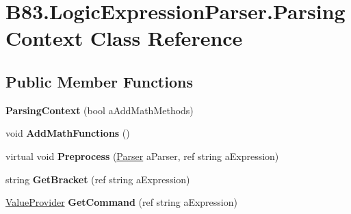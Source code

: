 \hypertarget{class_b83_1_1_logic_expression_parser_1_1_parsing_context}{}\section{B83.\+Logic\+Expression\+Parser.\+Parsing\+Context Class Reference}
\label{class_b83_1_1_logic_expression_parser_1_1_parsing_context}
\subsection*{Public Member Functions}
\begin{DoxyCompactItemize}
\item 
{\bfseries Parsing\+Context} (bool a\+Add\+Math\+Methods)\hypertarget{class_b83_1_1_logic_expression_parser_1_1_parsing_context_a8fd3f96aa1ed41e9201cdacb86ffe727}{}\label{class_b83_1_1_logic_expression_parser_1_1_parsing_context_a8fd3f96aa1ed41e9201cdacb86ffe727}

\item 
void {\bfseries Add\+Math\+Functions} ()\hypertarget{class_b83_1_1_logic_expression_parser_1_1_parsing_context_adf13fec27f2b382ca752e5fd30584e09}{}\label{class_b83_1_1_logic_expression_parser_1_1_parsing_context_adf13fec27f2b382ca752e5fd30584e09}

\item 
virtual void {\bfseries Preprocess} (\hyperlink{class_b83_1_1_logic_expression_parser_1_1_parser}{Parser} a\+Parser, ref string a\+Expression)\hypertarget{class_b83_1_1_logic_expression_parser_1_1_parsing_context_a95d2e21709c1e9783c31177c64445f8d}{}\label{class_b83_1_1_logic_expression_parser_1_1_parsing_context_a95d2e21709c1e9783c31177c64445f8d}

\item 
string {\bfseries Get\+Bracket} (ref string a\+Expression)\hypertarget{class_b83_1_1_logic_expression_parser_1_1_parsing_context_a828bf690ce404dcfd6dcb3966b43efd4}{}\label{class_b83_1_1_logic_expression_parser_1_1_parsing_context_a828bf690ce404dcfd6dcb3966b43efd4}

\item 
\hyperlink{class_b83_1_1_logic_expression_parser_1_1_value_provider}{Value\+Provider} {\bfseries Get\+Command} (ref string a\+Expression)\hypertarget{class_b83_1_1_logic_expression_parser_1_1_parsing_context_ae268397a55f773687a4005e528594741}{}\label{class_b83_1_1_logic_expression_parser_1_1_parsing_context_ae268397a55f773687a4005e528594741}


\end{DoxyCompactItemize}
